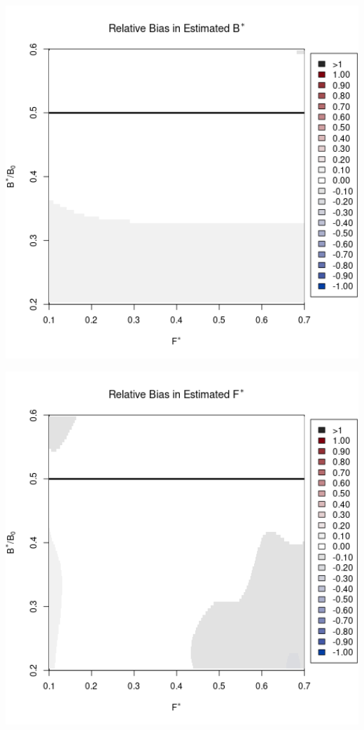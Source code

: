 \documentclass[ xcolor = pdftex, dvipsnames, table ]{beamer}
\begin{document}
\begin{frame}
\begin{minipage}[h!]{0.325\textwidth}
\hspace*{-0.25cm}
\includegraphics[width=1.1\textwidth]{../../.././nick/gpBias/bMSYRelBiasPellaExpT90.png}
\end{minipage}
\begin{minipage}[h!]{0.325\textwidth}
\hspace*{0.25cm}
\includegraphics[width=1.1\textwidth]{../../.././nick/gpBias/fMSYRelBiasPellaExpT45.png}\\

\end{minipage}
\end{frame}
\end{document}
